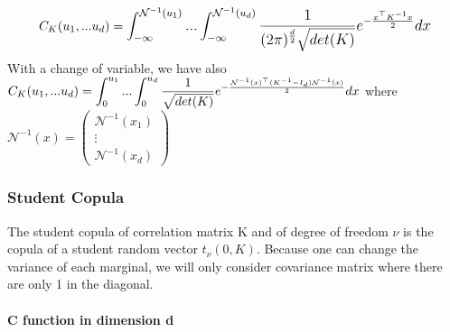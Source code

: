 \documentclass{article}
\begin{document}
	
	\begin{equation*}
	 C_{K}(u_{1},...u_{d})= \mathlarger{ \int_{-\infty}^{\mathcal{N}^{-1}(u_{1})}...\int_{-\infty}^{\mathcal{N}^{-1}(u_{d})} \frac{1}{(2\pi)^{\frac{d}{2}}\sqrt{det(K)}}e^{-\frac{x^\top K^{-1} x}{2}}dx}
	\end{equation*}
	\newline
	\newline
	With a change of variable, we have also \newline
	\newline
	\begin{math}
	C_{K}(u_{1},...u_{d})=  \mathlarger{ \int_{0}^{u_{1}}...\int_{0}^{u_{d}} \frac{1}{\sqrt{det(K)}}e^{-\frac{\mathcal{N}^{-1}(x)^\top (K^{-1}-I_{d}) \mathcal{N}^{-1}(x)}{2}}dx}
	\end{math}
	\newline
	\newline
	\newline
	where \begin{math} \mathcal{N}^{-1}(x) =  \begin{pmatrix}
   \mathcal{N}^{-1}(x_{1}) \\
  \vdots   \\
   \mathcal{N}^{-1}(x_{d})  
 \end{pmatrix}\end{math}
 



	\subsubsection{Student Copula}
	The student copula of correlation matrix K and of degree of freedom \begin{math} \nu \end{math} is the copula of a student random vector \begin{math} t_\nu (0,K) \end{math}.\newline
	\newline
	Because one can change the variance of each marginal, we will only consider covariance matrix where there are only 1 in the diagonal.
	\newline
	
	\paragraph{C function in dimension d}
	
\end{document}
